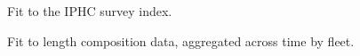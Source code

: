 \documentclass[
]{scrartcl}
\begin{document}
\begin{figure}


\caption{\label{fig-indexfit12}Fit to the IPHC survey index.}

\end{figure}%

\clearpage

\begin{figure}


\caption{\label{fig-agglencomps}Fit to length composition data,
aggregated across time by fleet.}

\end{figure}%
\end{document}
